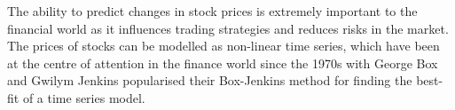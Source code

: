 The ability to predict changes in stock prices is extremely important to the financial world as it influences trading strategies and reduces risks in the market. The prices of stocks can be modelled as non-linear time series, which have been at the centre of attention in the finance world since the 1970s with George Box and Gwilym Jenkins popularised their Box-Jenkins method for finding the best-fit of a time series model\cite{box_jenkins}.

